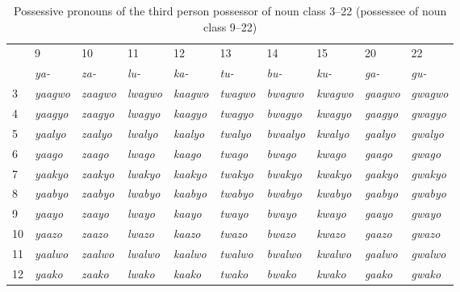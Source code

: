 \begin{sidewaystable}
\caption{Possessive pronouns of the third person possessor of noun class 3–22 (possessee of noun class 9–22)}
\begin{tabular}{l l l l l l l l l l}
\lsptoprule
 & 9 & 10 & 11 & 12 & 13 & 14 & 15 & 20 & 22\\
  & \textit{ya-} &  \textit{za-} &  \textit{lu-} &  \textit{ka-} &  \textit{tu-} &  \textit{bu-} &  \textit{ku-} &  \textit{ga-} &  \textit{gu-}\\

\midrule
 
3 & \textit{yaagwo} & \textit{zaagwo} & \textit{lwagwo} & \textit{kaagwo} & \textit{twagwo} & \textit{bwagwo} & \textit{kwagwo} & \textit{gaagwo} & \textit{gwagwo}\\
4 & \textit{yaagyo} & \textit{zaagyo} & \textit{lwagyo} & \textit{kaagyo} & \textit{twagyo} & \textit{bwagyo} & \textit{kwagyo} & \textit{gaagyo} & \textit{gwagyo}\\
5 & \textit{yaalyo} & \textit{zaalyo} & \textit{lwalyo} & \textit{kaalyo} & \textit{twalyo} & \textit{bwaalyo} & \textit{kwalyo} & \textit{gaalyo} & \textit{gwalyo}\\
6 & \textit{yaago} & \textit{zaago} & \textit{lwago} & \textit{kaago} & \textit{twago} & \textit{bwago} & \textit{kwago} & \textit{gaago} & \textit{gwago}\\
7 & \textit{yaakyo} & \textit{zaakyo} & \textit{lwakyo} & \textit{kaakyo} & \textit{twakyo} & \textit{bwakyo} & \textit{kwakyo} & \textit{gaakyo} & \textit{gwakyo}\\
8 & \textit{yaabyo} & \textit{zaabyo} & \textit{lwabyo} & \textit{kaabyo} & \textit{twabyo} & \textit{bwabyo} & \textit{kwabyo} & \textit{gaabyo} & \textit{gwabyo}\\
9 & \textit{yaayo} & \textit{zaayo} & \textit{lwayo} & \textit{kaayo} & \textit{twayo} & \textit{bwayo} & \textit{kwayo} & \textit{gaayo} & \textit{gwayo}\\
10 & \textit{yaazo} & \textit{zaazo} & \textit{lwazo} & \textit{kaazo} & \textit{twazo} & \textit{bwazo} & \textit{kwazo} & \textit{gaazo} & \textit{gwazo}\\
11 & \textit{yaalwo} & \textit{zaalwo} & \textit{lwalwo} & \textit{kaalwo} & \textit{twalwo} & \textit{bwalwo} & \textit{kwalwo} & \textit{gaalwo} & \textit{gwalwo}\\
12 & \textit{yaako} & \textit{zaako} & \textit{lwako} & \textit{kaako} & \textit{twako} & \textit{bwako} & \textit{kwako} & \textit{gaako} & \textit{gwako}\\

\end{tabular}
\end{sidewaystable}
